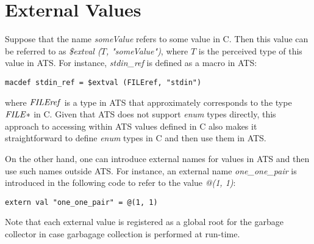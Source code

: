 \section{External Values}
Suppose that the name {\it someValue} refers to some value in C. Then this
value can be referred to as {\it \$extval ($T$, "someValue")}, where $T$ is
the perceived type of this value in ATS. For instance, {\it stdin\_ref} is
defined as a macro in ATS:
\begin{verbatim}
macdef stdin_ref = $extval (FILEref, "stdin")
\end{verbatim}
where ${\it FILEref}$ is a type in ATS that approximately corresponds to
the type ${\it FILE*}$ in C. Given that ATS does not support {\it enum}
types directly, this approach to accessing within ATS values defined in C
also makes it straightforward to define {\it enum} types in C and then use
them in ATS.

On the other hand, one can introduce external
names for values in ATS and then use such names outside ATS. For instance,
an external name {\it one\_one\_pair} is introduced in the following code
to refer to the value {\it @(1, 1)}:
\begin{verbatim}
extern val "one_one_pair" = @(1, 1)
\end{verbatim}
Note that each external value is registered as a global root for the
garbage collector in case garbagage collection is performed at run-time.

